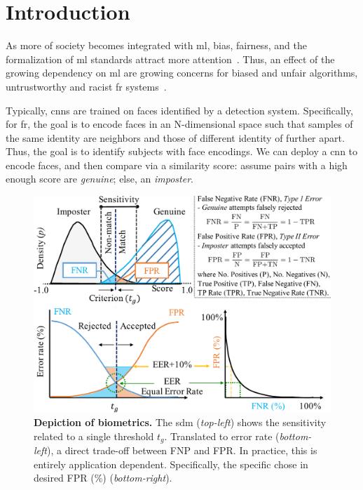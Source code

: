 
\glsresetall
\section{Introduction}
    As more of society becomes integrated with \gls{ml}, bias, fairness, and the formalization of \gls{ml} standards attract more attention~\cite{10.1007/978-3-030-13469-3_68, anne2018women, wang2018racial}. Thus, an effect of the growing dependency on \gls{ml} are growing concerns for biased and unfair algorithms, \eg untrustworthy and racist \gls{fr} systems~\cite{england2019,snow2018}.
    


    Typically, \glspl{cnn} are trained on faces identified by a detection system. Specifically, for \gls{fr}, the goal is to encode faces in an N-dimensional space such that samples of the same identity are neighbors and those of different identity of further apart. Thus, the goal is to identify subjects with face encodings. We can deploy a \gls{cnn} to encode faces, and then compare via a similarity score: assume pairs with a high enough score are \emph{genuine}; else, an \emph{imposter}. 

\begin{figure}
    \centering
    \includegraphics[width=\linewidth]{figures/fig1-crop.pdf}
    \caption{\small{\textbf{Depiction of biometrics.} The \gls{sdm} (\emph{top-left}) shows the sensitivity related to a single threshold $t_g$. Translated to error rate (\emph{bottom-left}), a direct trade-off between FNP and FPR. In practice, this is entirely application dependent. Specifically, the specific chose in desired FPR (\%) (\emph{bottom-right}).}}
    \label{fig:biometrics}
\end{figure}

